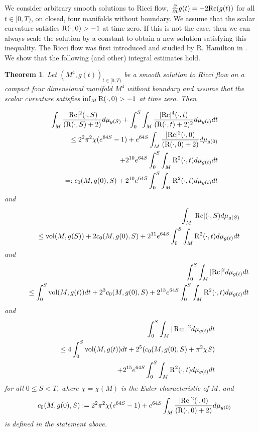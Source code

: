 \documentclass{amsart}
\numberwithin{equation}{section}
\newtheorem{theo}{Theorem}[section]
\theoremstyle{definition}
\theoremstyle{remark}
\begin{document}
We consider arbitrary smooth solutions to
Ricci flow, ${\frac{\partial }{\partial t} } g(t) = -2{{\rm{Rc}}}(g(t))$ for all $t \in [0,T)$, on
closed, four manifolds without boundary. We assume that the scalar curvature
satisfies ${{\rm R}}(\cdot,0) >-1$ at time zero. If this is not the case, then we can always
scale the solution by a constant to obtain  a new solution satisfying
this inequality. The Ricci flow was first introduced and studied by R. Hamilton
in  \cite{HaThree}. We show that the following (and
other) integral estimates hold.
\begin{theo}\label{intestgen}
Let $(M^4,g(t))_{t\in [0,T)}$ be a smooth solution to Ricci flow  on a
compact four dimensional manifold $M^4$ without boundary and assume
that the scalar curvature satisfies $\inf_M
{{\rm R}}(\cdot,0) > -1$ at time zero.  Then

\begin{eqnarray}
&& \int_M \frac{|{{\rm{Rc}}}|^2(\cdot,S)}{({{\rm R}}(\cdot,S) +2)} d\mu_{g(S)}  +
 \int_0^S  \int_M  \frac{|{{\rm{Rc}}}|^4(\cdot,t)}{({{\rm R}}(\cdot,t) +2)^2} d\mu_{g(t)} dt  \cr 
&& \ \ \ \ \leq 
2^2\pi^2 \chi(e^{64S} - 1) + e^{64S}\int_M
\frac{|{{\rm{Rc}}}|^2(\cdot,0)}{({{\rm R}}(\cdot,0) +2)} d\mu_{g(0)} \cr
&& \ \ \ \ \ \
+2^{10}e^{64S}\int_0^S \int_M {{\rm R}}^2(\cdot,t) d\mu_{g(t)} dt   \cr
&& =: c_0(M,g(0),S) + 2^{10}e^{64S}\int_0^S \int_M {{\rm R}}^2(\cdot,t) d\mu_{g(t)} dt \label{generalintro1}
 \end{eqnarray}
and
\begin{eqnarray}
 &&\int_M |{{\rm{Rc}}}|(\cdot,S) d\mu_{g(S)} \cr
&& \ \ \ \ \leq  \operatorname{vol}(M,g(S)) + 2c_0(M,g(0),S)  + 2^{11}  e^{64S}\int_0^S \int_M {{\rm R}}^2(\cdot,t) d\mu_{g(t)} dt  \label{generalintro2}
\end{eqnarray}
and
\begin{eqnarray}
&&\int_0^S \int_M |{{\rm{Rc}}}|^2  d\mu_{g(t)} dt \cr
&&\ \ \ \ \leq \int_0^S \operatorname{vol}(M,g(t)) dt
+2^3c_0(M,g(0),S)
+ 2^{13} e^{64S}\int_0^S \int_M {{\rm R}}^2(\cdot,t) d\mu_{g(t)} dt
 \label{generalintro3}
\end{eqnarray}
and
\begin{eqnarray}
&&\int_0^S \int_M |\operatorname{Rm}|^2  d\mu_{g(t)} dt \cr 
&& \ \  \
\leq 4\int_0^S \operatorname{vol}(M,g(t)) dt 
+ 2^5( c_0(M,g(0),S) + \pi^2 \chi S) \cr
&& \ \ \ \ +2^{15} e^{64S}\int_0^S \int_M {{\rm R}}^2(\cdot,t) d\mu_{g(t)} dt 
 \label{generalintro4} 
\end{eqnarray}
for all $0\leq S <T$, where $\chi = \chi(M)$ is the
Euler-characteristic of $M$, and 
\begin{eqnarray}
&& c_0(M,g(0),S):= 2^2\pi^2 \chi(e^{64S} - 1) + e^{64S}\int_M
\frac{|{{\rm{Rc}}}|^2(\cdot,0)}{({{\rm R}}(\cdot,0) +2)} d\mu_{g(0)} 
\end{eqnarray}
is defined in the statement above.
\end{theo}
\end{document}
